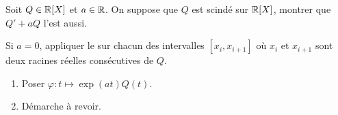 \begin{exercice}
    Soit $Q \in \mathbb{R}[X]$ et $a \in \mathbb{R}$. On suppose que $Q$ est scindé sur $\mathbb{R}[X]$, montrer que $Q'+aQ$ l'est aussi. 
\end{exercice}

\begin{elem_sol}
    Si $a=0$, appliquer le  sur chacun des intervalles $[x_i, x_{i+1}]$ où $x_i$ et $x_{i+1}$ sont deux racines réelles consécutives de $Q$.
    \begin{enumerate} 
        \item Poser $\varphi:t \mapsto \exp(at)Q(t)$.
        \item Démarche à revoir.
    \end{enumerate}
\end{elem_sol}